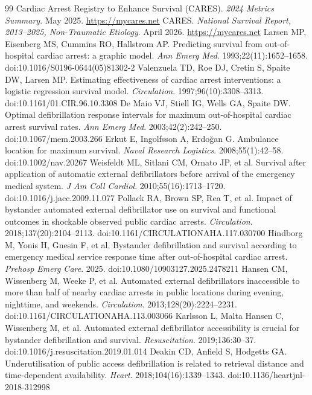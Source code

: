 \documentclass[11pt]{article}
\begin{document}
\begin{thebibliography}{99}\small
{} Cardiac Arrest Registry to Enhance Survival (CARES). \emph{2024 Metrics Summary}. May 2025. \url{https://mycares.net}
 CARES. \emph{National Survival Report, 2013--2025, Non-Traumatic Etiology}. April 2026. \url{https://mycares.net}
 Larsen MP, Eisenberg MS, Cummins RO, Hallstrom AP. Predicting survival from out-of-hospital cardiac arrest: a graphic model. \emph{Ann Emerg Med}. 1993;22(11):1652--1658. doi:10.1016/S0196-0644(05)81302-2
 Valenzuela TD, Roe DJ, Cretin S, Spaite DW, Larsen MP. Estimating effectiveness of cardiac arrest interventions: a logistic regression survival model. \emph{Circulation}. 1997;96(10):3308--3313. doi:10.1161/01.CIR.96.10.3308
 De Maio VJ, Stiell IG, Wells GA, Spaite DW. Optimal defibrillation response intervals for maximum out-of-hospital cardiac arrest survival rates. \emph{Ann Emerg Med}. 2003;42(2):242--250. doi:10.1067/mem.2003.266
 Erkut E, Ingolfsson A, Erdo\u{g}an G. Ambulance location for maximum survival. \emph{Naval Research Logistics}. 2008;55(1):42--58. doi:10.1002/nav.20267
 Weisfeldt ML, Sitlani CM, Ornato JP, et al. Survival after application of automatic external defibrillators before arrival of the emergency medical system. \emph{J Am Coll Cardiol}. 2010;55(16):1713--1720. doi:10.1016/j.jacc.2009.11.077
 Pollack RA, Brown SP, Rea T, et al. Impact of bystander automated external defibrillator use on survival and functional outcomes in shockable observed public cardiac arrests. \emph{Circulation}. 2018;137(20):2104--2113. doi:10.1161/CIRCULATIONAHA.117.030700
 Hindborg M, Yonis H, Gnesin F, et al. Bystander defibrillation and survival according to emergency medical service response time after out-of-hospital cardiac arrest. \emph{Prehosp Emerg Care}. 2025. doi:10.1080/10903127.2025.2478211
 Hansen CM, Wissenberg M, Weeke P, et al. Automated external defibrillators inaccessible to more than half of nearby cardiac arrests in public locations during evening, nighttime, and weekends. \emph{Circulation}. 2013;128(20):2224--2231. doi:10.1161/CIRCULATIONAHA.113.003066
 Karlsson L, Malta Hansen C, Wissenberg M, et al. Automated external defibrillator accessibility is crucial for bystander defibrillation and survival. \emph{Resuscitation}. 2019;136:30--37. doi:10.1016/j.resuscitation.2019.01.014
 Deakin CD, Anfield S, Hodgetts GA. Underutilisation of public access defibrillation is related to retrieval distance and time-dependent availability. \emph{Heart}. 2018;104(16):1339--1343. doi:10.1136/heartjnl-2018-312998

\end{thebibliography}
\end{document}
